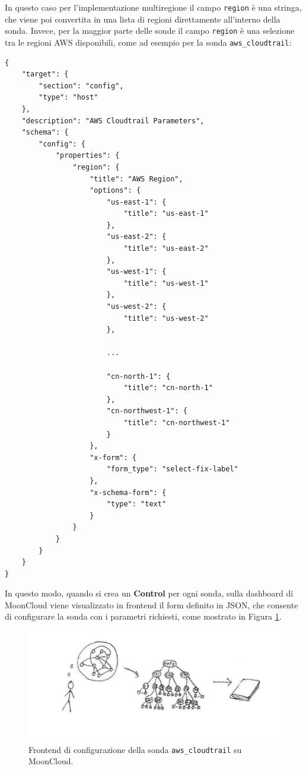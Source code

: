In questo caso per l'implementazione multiregione il campo \texttt{region} è una stringa, che viene poi convertita in una lista di regioni direttamente all'interno della sonda. Invece, per la maggior parte delle sonde il campo \texttt{region} è una selezione tra le regioni AWS disponibili, come ad esempio per la sonda \texttt{aws\_cloudtrail}:

\begin{lstlisting}[style=myjson, caption={Form di configurazione per la sonda \texttt{aws\_cloudtrail}}]
{
    "target": {
        "section": "config",
        "type": "host"
    },
    "description": "AWS Cloudtrail Parameters",
    "schema": {
        "config": {
            "properties": {
                "region": {
                    "title": "AWS Region",
                    "options": {
                        "us-east-1": {
                            "title": "us-east-1"
                        },
                        "us-east-2": {
                            "title": "us-east-2"
                        },
                        "us-west-1": {
                            "title": "us-west-1"
                        },
                        "us-west-2": {
                            "title": "us-west-2"
                        },

                        ...

                        "cn-north-1": {
                            "title": "cn-north-1"
                        },
                        "cn-northwest-1": {
                            "title": "cn-northwest-1"
                        }
                    },
                    "x-form": {
                        "form_type": "select-fix-label"
                    },
                    "x-schema-form": {
                        "type": "text"
                    }
                }
            }
        }
    }
}
\end{lstlisting}

In questo modo, quando si crea un \textbf{Control} per ogni sonda, sulla dashboard di MoonCloud viene visualizzato in frontend il form definito in JSON, che consente di configurare la sonda con i parametri richiesti, come mostrato in Figura \ref{fig:awscloudtrailform}.

\begin{center}
\begin{figure}
\centering
\includegraphics[width=\textwidth]{immagini/ideas2text.pdf}
\caption{Frontend di configurazione della sonda \texttt{aws\_cloudtrail} su MoonCloud.}
\label{fig:awscloudtrailform}
\end{figure}
\end{center}

